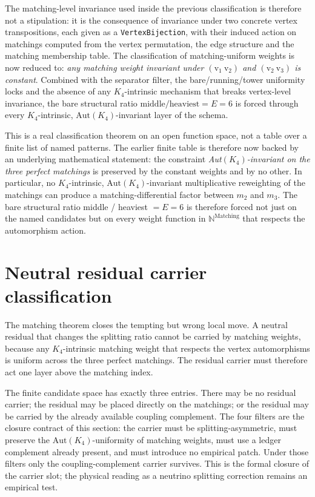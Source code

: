 \documentclass[11pt]{article}
\begin{document}
The matching-level invariance used inside the previous classification
is therefore not a stipulation: it is the consequence of invariance
under two concrete vertex transpositions, each given as a
\texttt{VertexBijection}, with their induced action on matchings
computed from the vertex permutation, the edge structure and the
matching membership table.  The classification of matching-uniform
weights is now reduced to: \emph{any matching weight invariant under
$(\mathrm{v_1}\ \mathrm{v_2})$ and $(\mathrm{v_2}\ \mathrm{v_3})$ is
constant}.  Combined with the separator filter, the bare/running/tower
uniformity locks and the absence of any $K_4$-intrinsic mechanism
that breaks vertex-level invariance, the bare structural ratio
$\text{middle}/\text{heaviest} = E = 6$ is forced through every
$K_4$-intrinsic, $\mathrm{Aut}(K_4)$-invariant layer of the schema.

This is a real classification theorem on an open function space, not
a table over a finite list of named patterns.  The earlier finite
table is therefore now backed by an underlying mathematical statement:
the constraint \emph{Aut$(K_4)$-invariant on the three perfect
matchings} is preserved by the constant weights and by no other.  In
particular, no $K_4$-intrinsic, $\mathrm{Aut}(K_4)$-invariant
multiplicative reweighting of the matchings can produce a
matching-differential factor between $m_2$ and $m_3$.  The bare
structural ratio middle / heaviest $= E = 6$ is therefore forced not
just on the named candidates but on every weight function in
$\mathbb{N}^{\mathrm{Matching}}$ that respects the automorphism
action.

\section{Neutral residual carrier classification}

The matching theorem closes the tempting but wrong local move.  A
neutral residual that changes the splitting ratio cannot be carried by
matching weights, because any $K_4$-intrinsic matching weight that
respects the vertex automorphisms is uniform across the three perfect
matchings.  The residual carrier must therefore act one layer above the
matching index.

The finite candidate space has exactly three entries.  There may be no
residual carrier; the residual may be placed directly on the matchings;
or the residual may be carried by the already available coupling
complement.  The four filters are the closure contract of this section:
the carrier must be splitting-asymmetric, must preserve the
$\mathrm{Aut}(K_4)$-uniformity of matching weights, must use a ledger
complement already present, and must introduce no empirical patch.  Under
those filters only the coupling-complement carrier survives.  This is the
formal closure of the carrier slot; the physical reading as a neutrino
splitting correction remains an empirical test.
\end{document}
